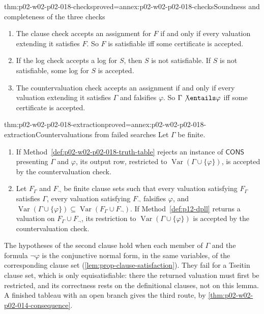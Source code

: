 \begin{hbtheorem}{thm:p02-w02-p02-018-checks}{proved=annex:p02-w02-p02-018-checks}{Soundness and completeness of the three checks}
\begin{enumerate}
\item The clause check accepts an assignment for \(F\) if and only if every
      valuation extending it satisfies \(F\).  So \(F\) is satisfiable iff
      some certificate is accepted.
\item If the log check accepts a log for \(S\), then \(S\) is not
      satisfiable.  If \(S\) is not satisfiable, some log for \(S\) is
      accepted.
\item The countervaluation check accepts an assignment if and only if every
      valuation extending it satisfies \(\Gamma\) and falsifies \(\varphi\).
      So \(\Gamma\not\entails\varphi\) iff some certificate is accepted.
\end{enumerate}
\end{hbtheorem}

\begin{hblemma}{thm:p02-w02-p02-018-extraction}{proved=annex:p02-w02-p02-018-extraction}{Countervaluations from failed searches}
Let \(\Gamma\) be finite.
\begin{enumerate}
\item If Method~\ref{def:p02-w02-p02-018-truth-table} rejects an instance of
      \(\mathsf{CONS}\) presenting \(\Gamma\) and \(\varphi\), its output row,
      restricted to \(\operatorname{Var}(\Gamma\cup\{\varphi\})\), is accepted
      by the countervaluation check.
\item Let \(F_\Gamma\) and \(F_\neg\) be finite clause sets such that every
      valuation satisfying \(F_\Gamma\) satisfies \(\Gamma\), every valuation
      satisfying \(F_\neg\) falsifies \(\varphi\), and
      \(\operatorname{Var}(\Gamma\cup\{\varphi\})\subseteq
      \operatorname{Var}(F_\Gamma\cup F_\neg)\).  If
      Method~\ref{def:p12-dpll} returns a valuation on
      \(F_\Gamma\cup F_\neg\), its restriction to
      \(\operatorname{Var}(\Gamma\cup\{\varphi\})\) is accepted by the
      countervaluation check.
\end{enumerate}
\end{hblemma}

The hypotheses of the second clause hold when each member of \(\Gamma\) and
the formula \(\neg\varphi\) is the conjunctive normal form, in the same
variables, of the corresponding clause set
(\cref{lem:prop-clause-satisfaction}).  They fail for a Tseitin clause set,
which is only equisatisfiable: there the returned valuation must first be
restricted, and its correctness rests on the definitional clauses, not on this
lemma.  A finished tableau with an open branch gives the third route, by
\cref{thm:p02-w02-p02-014-consequence}.

